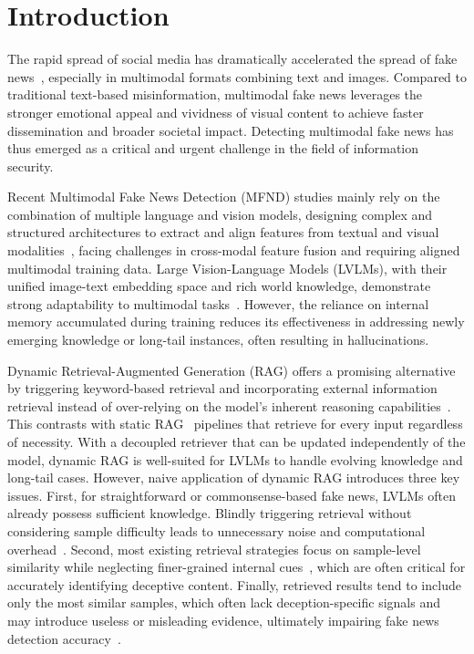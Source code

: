 \section{Introduction}
The rapid spread of social media has dramatically accelerated the spread of fake news~\cite{shu2017fake}, especially in multimodal formats combining text and images. Compared to traditional text-based misinformation, multimodal fake news leverages the stronger emotional appeal and vividness of visual content to achieve faster dissemination and broader societal impact. Detecting multimodal fake news has thus emerged as a critical and urgent challenge in the field of information security.

Recent Multimodal Fake News Detection (MFND) studies mainly rely on the combination of multiple language and vision models, designing complex and structured architectures to extract and align features from textual and visual modalities~\cite{dong2024unveiling, tong2024mmdfnd}, facing challenges in cross-modal feature fusion and requiring aligned multimodal training data.
Large Vision-Language Models (LVLMs), with their unified image-text embedding space and rich world knowledge, demonstrate strong adaptability to multimodal tasks~\cite{liu2024fka}. 
However, the reliance on internal memory accumulated during training reduces its effectiveness in addressing newly emerging knowledge or long-tail instances, often resulting in hallucinations.

Dynamic Retrieval-Augmented Generation (RAG) offers a promising alternative by triggering keyword-based retrieval and incorporating external information retrieval instead of over-relying on the model’s inherent reasoning capabilities~\cite{abootorabi2025ask,mei2025survey}. This contrasts with static RAG~\cite{sohn2025rationale,wu2025sitembv15improvedcontextawaredense,li2025mindscapeawareretrievalaugmentedgeneration} pipelines that retrieve for every input regardless of necessity. With a decoupled retriever that can be updated independently of the model, dynamic RAG is well-suited for LVLMs to handle evolving knowledge and long-tail cases.
However, naive application of dynamic RAG introduces three key issues. 
First, for straightforward or commonsense-based fake news, LVLMs often already possess sufficient knowledge. Blindly triggering retrieval without considering sample difficulty leads to unnecessary noise and computational overhead~\cite{su2024dragin,jeong2024adaptive}.
Second, most existing retrieval strategies focus on sample-level similarity while neglecting finer-grained internal cues~\cite{tang2024leveraging,mei2025survey}, which are often critical for accurately identifying deceptive content.
Finally, retrieved results tend to include only the most similar samples, which often lack deception-specific signals and may introduce useless or misleading evidence, ultimately impairing fake news detection accuracy~\cite{tang2024leveraging}.

